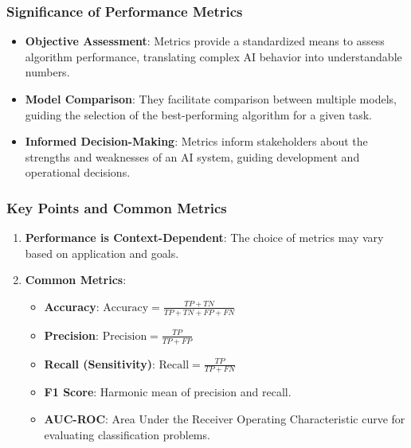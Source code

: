 \documentclass[aspectratio=169]{beamer}
\begin{document}
\begin{frame}[fragile]
    \frametitle{Significance of Performance Metrics}
    \begin{itemize}
        \item \textbf{Objective Assessment}: Metrics provide a standardized means to assess algorithm performance, translating complex AI behavior into understandable numbers.
        
        \item \textbf{Model Comparison}: They facilitate comparison between multiple models, guiding the selection of the best-performing algorithm for a given task.
        
        \item \textbf{Informed Decision-Making}: Metrics inform stakeholders about the strengths and weaknesses of an AI system, guiding development and operational decisions.
    \end{itemize}
\end{frame}

\begin{frame}[fragile]
    \frametitle{Key Points and Common Metrics}
    \begin{enumerate}
        \item \textbf{Performance is Context-Dependent}: The choice of metrics may vary based on application and goals.
        
        \item \textbf{Common Metrics}:
        \begin{itemize}
            \item \textbf{Accuracy}: \( \text{Accuracy} = \frac{TP + TN}{TP + TN + FP + FN} \)
            \item \textbf{Precision}: \( \text{Precision} = \frac{TP}{TP + FP} \)
            \item \textbf{Recall (Sensitivity)}: \( \text{Recall} = \frac{TP}{TP + FN} \)
            \item \textbf{F1 Score}: Harmonic mean of precision and recall.
            \item \textbf{AUC-ROC}: Area Under the Receiver Operating Characteristic curve for evaluating classification problems.
        \end{itemize}
    \end{enumerate}
\end{frame}
\end{document}

